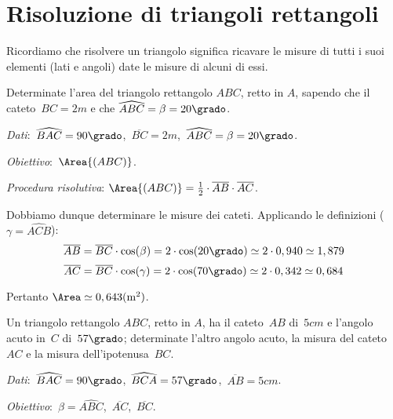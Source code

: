 \ovalbox{\risolvi \ref{ese:C.6}}

\section{Risoluzione di triangoli rettangoli}

Ricordiamo che risolvere un triangolo significa ricavare le misure di tutti i suoi elementi (lati e angoli) date le misure di alcuni di essi.

\begin{exrig}
 \begin{esempio}
Determinate l'area del triangolo rettangolo $ABC$, retto in $A$, sapendo che il cateto~${BC}=2\unit{m}$ e che $\widehat{ABC}=\beta=20\grado$.

\emph{Dati}:~$\widehat{BAC}=90\grado$,\quad~$\overline{BC}=2\unit{m}$,\quad~$\widehat{ABC}=\beta=20\grado$.

\emph{Obiettivo}:~$\Area{(ABC)}$.

\emph{Procedura risolutiva}:
$\Area{(ABC)}=\frac{1}{2}\cdot \overline{AB}\cdot \overline{AC}$.

Dobbiamo dunque determinare le misure dei cateti. Applicando le definizioni ($\gamma=\widehat{ACB}$):
\[\overline{AB}=\overline{BC}\cdot {\cos(\beta)}=2\cdot {\cos(20\grado)}\simeq 2\cdot 0,940\simeq 1,879\]
\[\overline{AC}=\overline{BC}\cdot {\cos(\gamma)}=2\cdot {\cos(70\grado)}\simeq 2\cdot 0,342\simeq 0,684\]

Pertanto $\Area\simeq 0,643\unit{(m^{2})}$.
 \end{esempio}

 \begin{esempio}
Un triangolo rettangolo $ABC$, retto in $A$, ha il cateto~$AB$ di~$5\unit{cm}$ e l'angolo acuto in~$C$ di~$57\grado$; determinate l'altro angolo acuto,
la misura del cateto~$AC$ e la misura dell'ipotenusa~$BC$.

\emph{Dati}:~$\widehat{BAC}=90\grado$,\quad~$\widehat{BCA}=57\grado$,\quad~$\overline{AB}=5\unit{cm}$.

\emph{Obiettivo}:~$\beta=\widehat{ABC}$,\quad~$\overline{AC}$,\quad~$\overline{BC}$.


\end{esempio}
\end{exrig}
